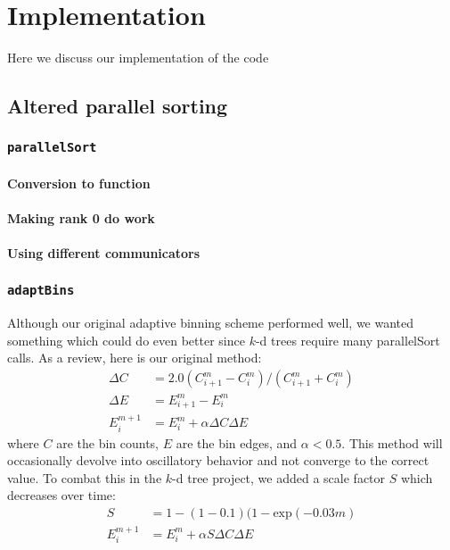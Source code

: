 \documentclass{article}
\begin{document}
\section{Implementation}
Here we discuss our implementation of the code

\subsection{Altered parallel sorting}


\subsubsection{\texttt{parallelSort}}

\paragraph{Conversion to function}

\paragraph{Making rank 0 do work}

\paragraph{Using different communicators}



\subsubsection{\texttt{adaptBins}}
Although our original adaptive binning scheme performed well, we wanted something which could do even better since $k$-d trees require many parallelSort calls. As a review, here is our original method:
\begin{equation}
	\begin{split}
		\Delta C & = 2.0 ( C^{m}_{i+1} - C^{m}_i ) / ( C^{m}_{i+1} + C^{m}_i ) \\
		\Delta E & = E^m_{i+1} - E^m_i \\
		E^{m+1}_i & = E^m_i + \alpha \Delta C \Delta E
	\end{split}
\end{equation}
where $C$ are the bin counts, $E$ are the bin edges, and $\alpha < 0.5$. This method will occasionally devolve into oscillatory behavior and not converge to the correct value. To combat this in the $k$-d tree project, we added a scale factor $S$ which decreases over time:
\begin{equation}
	\begin{split}
		S & = 1 - (1 - 0.1) (1 - \textrm{exp}(-0.03 m) \\
		E^{m+1}_i & = E^m_i + \alpha S \Delta C \Delta E
	\end{split}
\end{equation}
\end{document}
